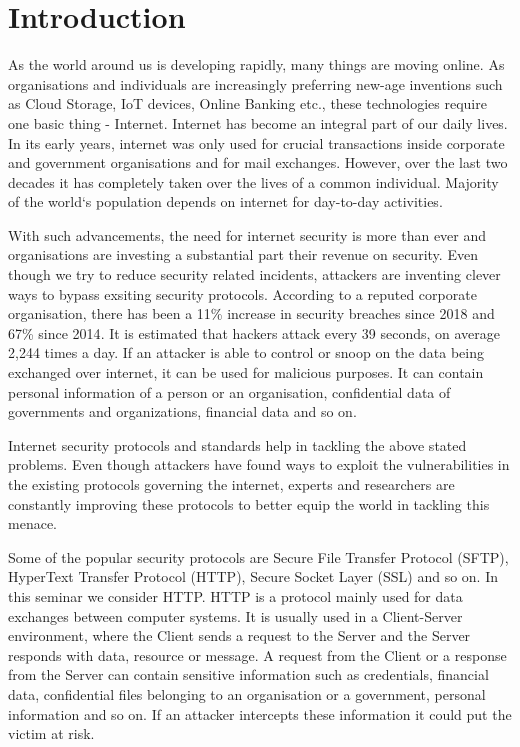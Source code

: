 \chapter{Introduction}

As the world around us is developing rapidly, many things are moving online. As organisations and individuals are increasingly preferring new-age inventions such as Cloud Storage, IoT devices, Online Banking etc., these technologies require one basic thing - Internet. Internet has become an integral part of our daily lives. In its early years, internet was only used for crucial transactions inside corporate and government organisations and for mail exchanges. However, over the last two decades it has completely taken over the lives of a common individual. Majority of the world`s population depends on internet for day-to-day activities. 

With such advancements, the need for internet security is more than ever and organisations are investing a substantial part their revenue on security\cite{b2}. Even though we try to reduce security related incidents, attackers are inventing clever ways to bypass exsiting security protocols. According to a reputed corporate organisation, there has been a 11\% increase in security breaches since 2018 and 67\% since 2014\cite{b3}. It is estimated that hackers attack every 39 seconds, on average 2,244 times a day\cite{b4}. If an attacker is able to control or snoop on the data being exchanged over internet, it can be used for malicious purposes. It can contain personal information of a person or an organisation, confidential data of governments and organizations, financial data and so on.

Internet security protocols and standards help in tackling the above stated problems. Even though attackers have found ways to exploit the vulnerabilities in the existing protocols governing the internet, experts and researchers are constantly improving these protocols to better equip the world in tackling this menace.  

Some of the popular security protocols are Secure File Transfer Protocol (SFTP), HyperText Transfer Protocol (HTTP), Secure Socket Layer (SSL) and so on. In this seminar we consider HTTP. HTTP is a protocol mainly used for data exchanges between computer systems. It is usually used in a Client-Server environment, where the Client sends a request to the Server and the Server responds with data, resource or message. A request from the Client or a response from the Server can contain sensitive information such as credentials, financial data, confidential files belonging to an organisation or a government, personal information and so on. If an attacker intercepts these information it could put the victim at risk.  

